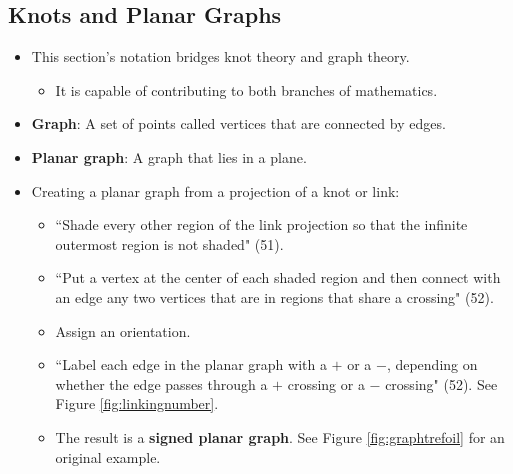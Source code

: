 \documentclass[titlepage]{article}
\numberwithin{figure}{section}
\numberwithin{table}{section}
\numberwithin{equation}{section}
\newcommand{\dq}[2]{``#1" (#2).}
\begin{document}
\subsection{Knots and Planar Graphs}\label{sss:SignedGraphs}
\begin{itemize}
    \item This section's notation bridges knot theory and graph theory.
    \begin{itemize}
        \item It is capable of contributing to both branches of mathematics.
    \end{itemize}
    \item \textbf{Graph}: A set of points called vertices that are connected by edges.
    \item \textbf{Planar graph}: A graph that lies in a plane.
    \item Creating a planar graph from a projection of a knot or link:
    \begin{itemize}
        \item \dq{Shade every other region of the link projection so that the infinite outermost region is not shaded}{51}
        \item \dq{Put a vertex at the center of each shaded region and then connect with an edge any two vertices that are in regions that share a crossing}{52}
        \item Assign an orientation.
        \item \dq{Label each edge in the planar graph with a $+$ or a $-$, depending on whether the edge passes through a $+$ crossing or a $-$ crossing}{52} See Figure \ref{fig:linkingnumber}.
        \item The result is a \textbf{signed planar graph}. See Figure \ref{fig:graphtrefoil} for an original example.
    \end{itemize}
    \begin{figure}[h!]
        \centering
        \begin{subfigure}[b]{0.3\linewidth}
            \centering
\end{subfigure}
\end{figure}
\end{itemize}
\end{document}
